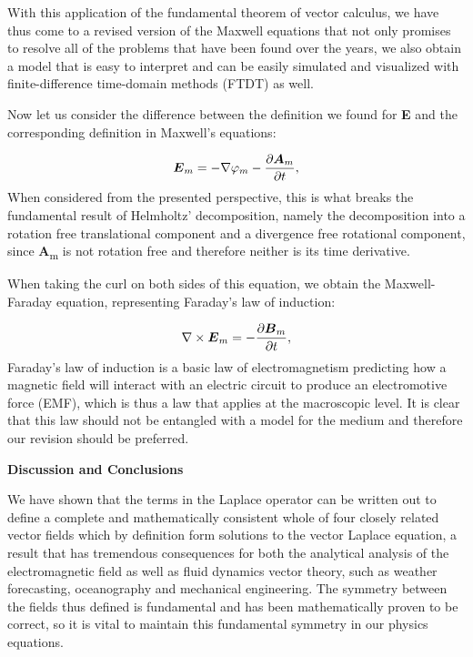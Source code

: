 \documentclass[a4paper]{article}
\newcommand\textstyleNone[1]{#1}
\newcommand\boldsubformula[1]{\text{\mathversion{bold}$#1$}}
\begin{document}
{
\textstyleNone{{With this application of the fundamental theorem of
vector calculus, we have thus come to a revised version of the Maxwell equations that not only promises to resolve all
of the problems that have been found over the years, we also obtain a model that is easy to interpret and can be easily
simulated and visualized with finite-difference time-domain methods (FTDT) as well. }}}

{
\textstyleNone{{Now let us consider the difference between the
definition we found for
}\textbf{{E}}{
and the corresponding definition in Maxwell's equations:}}}

\begin{equation}
\boldsubformula E_m=-\nabla \varphi _m-\frac{\partial \boldsubformula A_m}{\partial t},
\end{equation}
{
\textstyleNone{{When considered from the presented perspective, this
is what breaks the fundamental result of Helmholtz' decomposition, namely the decomposition into a rotation free
translational component and a divergence free rotational component, since
}\textbf{{A}}{\textsubscript{m}}{
is not rotation free and therefore neither is its time derivative.  }}}

{
\textstyleNone{{When taking the curl on both sides of this equation,
we obtain the Maxwell-Faraday equation, representing Faraday's law of induction:}}}

\begin{equation}
\nabla \times \boldsubformula E_m=-\frac{\partial \boldsubformula B_m}{\partial t},
\end{equation}
{
\textstyleNone{{Faraday's law of induction is a basic law of
electromagnetism predicting how a magnetic field will interact with an electric circuit to produce an electromotive
force (EMF), which is thus a law that applies at the macroscopic level. It is clear that this law should not be
entangled with a model for the medium and therefore our revision should be preferred.  }}}

{\centering
\textstyleNone{\textbf{{Discussion and Conclusions}}}
\par}

{
\textstyleNone{{We have shown that the terms in the Laplace operator
can be written out to define a complete and mathematically consistent whole of four closely related vector fields which
by definition form solutions to the vector Laplace equation, a result that has }tremendous consequences for both the
analytical analysis of the electromagnetic field as well as fluid dynamics vector }\textstyleNone{theory, such as
weather forecasting, oceanography and mechanical engineering. The symmetry between the fields thus defined is
fundamental and has been mathematically proven to be correct, so it is vital to maintain this fundamental symmetry in
our physics equations.  }}
\end{document}
